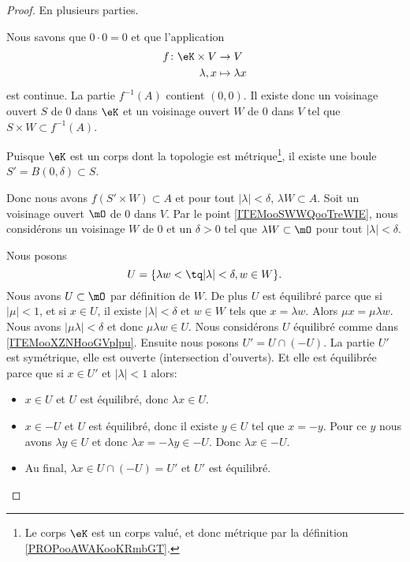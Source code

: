 \begin{proof}
	En plusieurs parties.
	\begin{subproof}
		Nous savons que \( 0\cdot 0=0\) et que l'application
		\begin{equation}
			\begin{aligned}
				f\colon \eK\times V & \to V             \\
				\lambda,x           & \mapsto \lambda x
			\end{aligned}
		\end{equation}
		est continue. La partie \( f^{-1}(A)\) contient \( (0,0)\). Il existe donc un voisinage ouvert \( S\) de \( 0\) dans \( \eK\) et un voisinage ouvert \( W\) de \( 0\) dans \( V\) tel que \( S\times W\subset f^{-1}(A)\).

		Puisque \( \eK\) est un corps dont la topologie est métrique\footnote{Le corps \( \eK\) est un corps valué, et donc métrique par la définition \ref{PROPooAWAKooKRmbGT}.}, il existe une boule \( S'=B(0,\delta)\subset S\).

		Donc nous avons \( f(S'\times W)\subset A \) et pour tout \( | \lambda |<\delta\), \( \lambda W\subset A\).
		Soit un voisinage ouvert \( \mO\) de \( 0\) dans \( V\). Par le point \ref{ITEMooSWWQooTreWIE}, nous considérons un voisinage \( W\) de \( 0\) et un \( \delta>0\) tel que \( \lambda W\subset\mO\) pour tout \( | \lambda |<\delta\).

		Nous posons
		\begin{equation}
			U=\{\lambda w<\tq | \lambda |<\delta, w\in W\}.
		\end{equation}
		Nous avons \( U\subset \mO\) par définition de \( W\). De plus \( U\) est équilibré parce que si \( | \mu |<1\), et si \( x\in U\), il existe \( | \lambda |<\delta\) et \( w\in W\) tels que \( x=\lambda w\). Alors \( \mu x=\mu\lambda w\). Nous avons \( | \mu\lambda |<\delta\) et donc \( \mu\lambda w\in U\).
		Nous considérons \( U\) équilibré comme dans \ref{ITEMooXZNHooGVplpu}. Ensuite nous posons \( U'=U\cap (-U)\). La partie \( U'\) est symétrique, elle est ouverte (intersection d'ouverts). Et elle est équilibrée parce que si \( x\in U'\) et \( | \lambda |<1\) alors:
		\begin{itemize}
			\item \( x\in U\) et \( U\) est équilibré, donc \( \lambda x\in U\).
			\item \( x\in -U\) et \( U\) est équilibré, donc il existe \( y\in U\) tel que \( x=-y\). Pour ce \( y\) nous avons \( \lambda y\in U\) et donc \( \lambda x=-\lambda y\in -U\). Donc \( \lambda x\in -U\).
			\item Au final, \( \lambda x\in U\cap (-U)=U'\) et \( U'\) est équilibré.
		\end{itemize}
	\end{subproof}
\end{proof}

